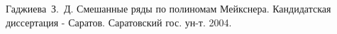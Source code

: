 \begin{thebibliography}{1}
%
%
%
%
%
%
%
%
%
%
%
%
%

Гаджиева~З.~Д. Смешанные ряды по полиномам Мейкснера. Кандидатская диссертация - Саратов. Саратовский гос. ун-т. 2004.


\end{thebibliography}
